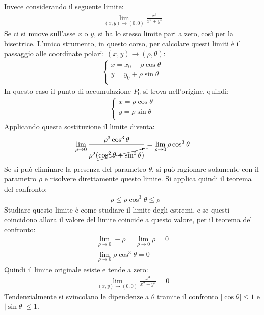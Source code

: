 \documentclass{article}
\numberwithin{equation}{subsection}
\begin{document}
Invece considerando il seguente limite:
\begin{gather*}
    \lim_{(x,y)\to(0,0)}\displaystyle\frac{x^3}{x^2+y^2}
\end{gather*}
Se ci si muove sull'asse $x$ o $y$, si ha lo stesso limite pari a zero, così per la bisettrice. L'unico strumento, in questo corso, per calcolare questi limiti è il passaggio alle coordinate polari: $(x,y)\to(\rho,\theta)$:
\begin{gather*}
    \begin{cases}
        x=x_0+\rho\cos\theta\\
        y=y_0+\rho\sin\theta\\
    \end{cases}
\end{gather*}
In questo caso il punto di accumulazione $P_0$ si trova nell'origine, quindi:
\begin{gather*}
    \begin{cases}
        x=\rho\cos\theta\\
        y=\rho\sin\theta\\
    \end{cases}    
\end{gather*}
Applicando questa sostituzione il limite diventa:
\begin{gather*}
    \lim_{\rho\to0}\displaystyle\frac{\rho^3\cos^3\theta}{\rho^2(\cancelto{1}{\cos^2\theta+\sin^2\theta})}=\lim_{\rho\to0}\rho\cos^3\theta
\end{gather*}
Se si può eliminare la presenza del parametro $\theta$, si può ragionare solamente con il parametro $\rho$ e risolvere direttamente questo limite. Si applica quindi il teorema del confronto:
\begin{gather*}
    -\rho\leq\rho\cos^3\theta\leq\rho
\end{gather*}
Studiare questo limite è come studiare il limite degli estremi, e se questi coincidono allora il valore del limite coincide a questo valore, per il teorema del confronto:
\begin{gather*}
    \lim_{\rho\to0}-\rho=\lim_{\rho\to0}\rho=0\\
    \lim_{\rho\to0}\rho\cos^3\theta=0
\end{gather*}
Quindi il limite originale esiste e tende a zero:
\begin{gather*}
    \lim_{(x,y)\to(0,0)}\displaystyle\frac{x^3}{x^2+y^2}=0
\end{gather*}
Tendenzialmente si svincolano le dipendenze a $\theta$ tramite il confronto $|\cos\theta|\leq1$ e $|\sin\theta|\leq1$. 
\end{document}
